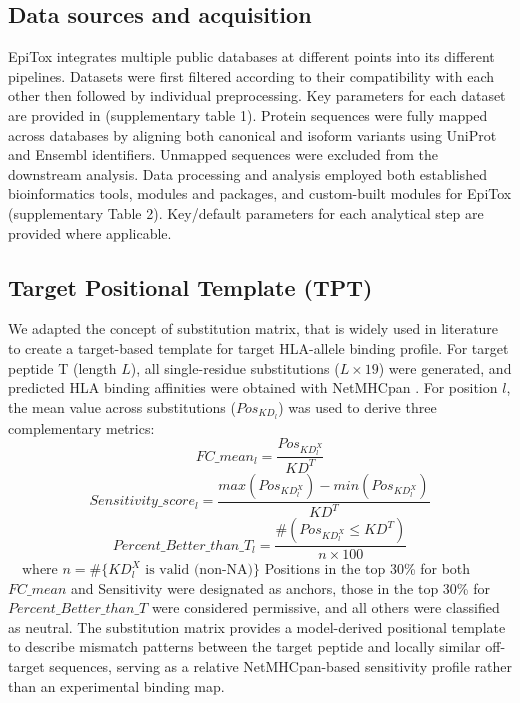 \documentclass[times, twoside, watermark]{zHenriquesLab-StyleBioRxiv}
\begin{document}
    \subsection{Data sources and acquisition} \label{methods:data} 
        EpiTox integrates multiple public databases at different points into its different pipelines. Datasets were first filtered according to their compatibility with each other then followed by individual preprocessing. Key parameters for each dataset are provided in (supplementary table 1). Protein sequences were fully mapped across databases by aligning both canonical and isoform variants using UniProt \cite{uniprot2025uniprot, ahmad2025uniprot} and Ensembl \cite{dyer2025ensembl} identifiers. Unmapped sequences were excluded from the downstream analysis. Data processing and analysis employed both established bioinformatics tools, modules and packages, and custom-built modules for EpiTox (supplementary Table 2). Key/default parameters for each analytical step are provided where applicable. 
    \subsection{Target Positional Template (TPT)} \label{methods:tpt} 
        We adapted the concept of substitution matrix, that is widely used in literature to create a target-based template for target HLA-allele binding profile. For target peptide T (length $L$), all single-residue substitutions ($L\times19$) were generated, and predicted HLA binding affinities were obtained with NetMHCpan \cite{reynisson2020netmhcpan}.
        For position $l$, the mean value across substitutions ($Pos_{KD_l}$) was used to derive three complementary metrics:
        \begin{equation}
                FC\_mean_l = \frac{Pos_{KD^{X}_{l}}}{KD^{T}}\label{fc_mean}
            \end{equation}
            \begin{equation}
                Sensitivity\_score_l = \frac{max(Pos_{KD^{X}_{l}}) - min(Pos_{KD^{X}_{l}})}{KD^{T}}\label{sens}
            \end{equation}
            \begin{equation}
                Percent\_Better\_than\_T_l = \frac{\#(Pos_{KD^{X}_{l}} \leq KD^{T})}{n \times 100} 
                \label{better_wt}
            \end{equation}
        $\quad \text{where } n = \#\{ KD^{X}_{l} \text{ is valid (non-NA)} \}$ 
        Positions in the top 30\% for both $FC\_mean$ and Sensitivity were designated as anchors, those in the top 30\% for $Percent\_Better\_than\_T$ were considered permissive, and all others were classified as neutral.
        The substitution matrix provides a model-derived positional template to describe mismatch patterns between the target peptide and locally similar off-target sequences, serving as a relative NetMHCpan-based sensitivity profile rather than an experimental binding map.
\end{document}
